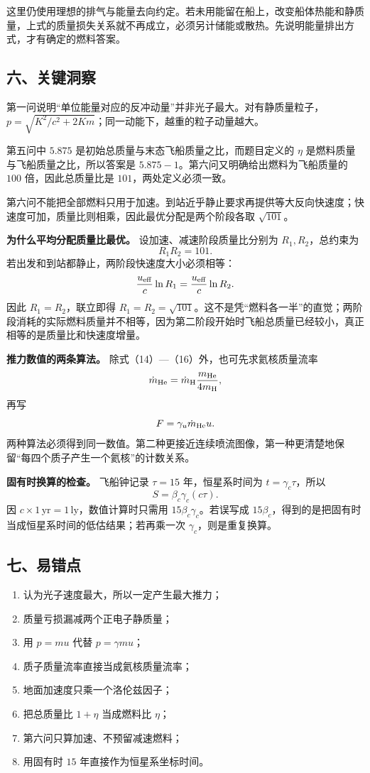 \documentclass[12pt,a4paper,UTF8]{ctexart}
\newcommand{\tightlist}{\setlength{\itemsep}{0pt}\setlength{\parskip}{0pt}}
\begin{document}
这里仍使用理想的排气与能量去向约定。若未用能留在船上，改变船体热能和静质量，上式的质量损失关系就不再成立，必须另计储能或散热。先说明能量排出方式，才有确定的燃料答案。

\subsection{六、关键洞察}\label{ux516dux5173ux952eux6d1eux5bdf-7}

第一问说明``单位能量对应的反冲动量''并非光子最大。对有静质量粒子，\(p=\sqrt{K^2/c^2+2Km}\)；同一动能下，越重的粒子动量越大。

第五问中 \(5.875\) 是初始总质量与末态飞船质量之比，而题目定义的 \(\eta\)
是燃料质量与飞船质量之比，所以答案是
\(5.875-1\)。第六问又明确给出燃料为飞船质量的 \(100\) 倍，因此总质量比是
\(101\)，两处定义必须一致。

第六问不能把全部燃料只用于加速。到站近乎静止要求再提供等大反向快速度；快速度可加，质量比则相乘，因此最优分配是两个阶段各取
\(\sqrt{101}\)。

\textbf{为什么平均分配质量比最优。} 设加速、减速阶段质量比分别为
\(R_1,R_2\)，总约束为 \[
R_1R_2=101.
\] 若出发和到站都静止，两阶段快速度大小必须相等： \[
\frac{u_{\rm eff}}c\ln R_1=\frac{u_{\rm eff}}c\ln R_2.
\] 因此 \(R_1=R_2\)，联立即得
\(R_1=R_2=\sqrt{101}\)。这不是凭``燃料各一半''的直觉；两阶段消耗的实际燃料质量并不相等，因为第二阶段开始时飞船总质量已经较小，真正相等的是质量比和快速度增量。

\textbf{推力数值的两条算法。}
除式（14）---（16）外，也可先求氦核质量流率 \[
\dot m_{\rm He}
=\dot m_{\rm H}\frac{m_{\rm He}}{4m_{\rm H}},
\] 再写 \[
F=\gamma_u\dot m_{\rm He}u.
\]
两种算法必须得到同一数值。第二种更接近连续喷流图像，第一种更清楚地保留``每四个质子产生一个氦核''的计数关系。

\textbf{固有时换算的检查。} 飞船钟记录 \(\tau=15\) 年，恒星系时间为
\(t=\gamma_c\tau\)，所以 \[
S=\beta_c\gamma_c(c\tau).
\] 因 \(c\times1\,\mathrm{yr}=1\,\mathrm{ly}\)，数值计算时只需用
\(15\beta_c\gamma_c\)。若误写成
\(15\beta_c\)，得到的是把固有时当成恒星系时间的低估结果；若再乘一次
\(\gamma_c\)，则是重复换算。

\subsection{七、易错点}\label{ux4e03ux6613ux9519ux70b9-7}

\begin{enumerate}
\def\labelenumi{\arabic{enumi}.}
\tightlist
\item
  认为光子速度最大，所以一定产生最大推力；
\item
  质量亏损漏减两个正电子静质量；
\item
  用 \(p=mu\) 代替 \(p=\gamma mu\)；
\item
  质子质量流率直接当成氦核质量流率；
\item
  地面加速度只乘一个洛伦兹因子；
\item
  把总质量比 \(1+\eta\) 当成燃料比 \(\eta\)；
\item
  第六问只算加速、不预留减速燃料；
\item
  用固有时 \(15\) 年直接作为恒星系坐标时间。
\end{enumerate}
\end{document}
